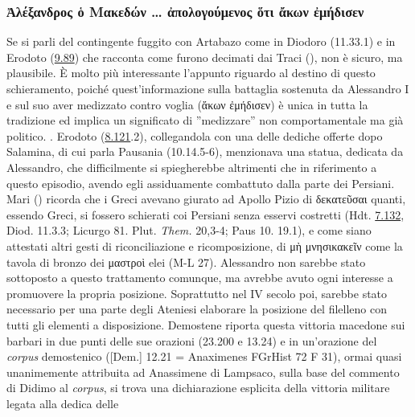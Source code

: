 {    \subsubsection{\textgreek{Ἀλέξανδρος ὁ Μακεδών … ἀπολογούμενος ὅτι ἄκων ἐμήδισεν}} 
    Se si parli del contingente fuggito con Artabazo come in  Diodoro (11.33.1) e in Erodoto (\href{http://data.perseus.org/citations/urn:cts:greekLit:tlg0016.tlg001.perseus-grc1:9.89}{9.89}) che racconta come furono decimati dai Traci (\cite[117]{Badian2006}), non è sicuro, ma plausibile. È molto più interessante l'appunto riguardo al destino di questo schieramento, poiché quest'informazione sulla battaglia sostenuta da Alessandro I e sul suo aver medizzato contro voglia (\textgreek{ἄκων ἐμήδισεν}) è unica in tutta la tradizione ed implica un significato di ''medizzare'' non comportamentale ma già politico. \cite[18]{Graf1984}. Erodoto (\href{http://data.perseus.org/citations/urn:cts:greekLit:tlg0016.tlg001.perseus-grc1:8.121}{8.121}.2), collegandola con una delle dediche offerte dopo Salamina, di cui parla Pausania (10.14.5-6), menzionava una statua, dedicata da Alessandro, che difficilmente si spiegherebbe altrimenti che in riferimento a questo episodio, avendo egli assiduamente combattuto dalla parte dei Persiani. Mari (\cite*[40]{Mari2000}) ricorda che i Greci avevano giurato ad Apollo Pizio  di \textgreek{δεκατεῦσαι} quanti, essendo Greci, si fossero schierati coi Persiani senza esservi costretti (Hdt. \href{http://data.perseus.org/citations/urn:cts:greekLit:tlg0016.tlg001.perseus-grc1:7.132}{7.132}, Diod. 11.3.3; Licurgo  81. Plut. \emph{Them.}   20,3-4; Paus 10. 19.1), e come siano attestati altri gesti di riconciliazione e ricomposizione, di  \textgreek{μὴ μνησικακεῖν}  come la tavola di bronzo dei \textgreek{μαστροὶ} elei (M-L 27). Alessandro non sarebbe stato sottoposto a questo trattamento comunque, ma avrebbe avuto ogni interesse a promuovere la propria posizione. Soprattutto nel IV secolo poi, sarebbe stato necessario per una parte degli Ateniesi elaborare la posizione del filelleno con tutti gli elementi a disposizione. Demostene riporta questa vittoria macedone sui barbari in due punti delle sue orazioni (23.200 e 13.24) e in un'orazione del \emph{corpus} demostenico ([Dem.] 12.21 = Anaximenes FGrHist 72 F 31\label{bkm:dem1221}), ormai quasi unanimemente attribuita ad Anassimene di Lampsaco, sulla base del commento di Didimo al \emph{corpus}, si trova una dichiarazione esplicita della vittoria militare legata alla dedica delle }
